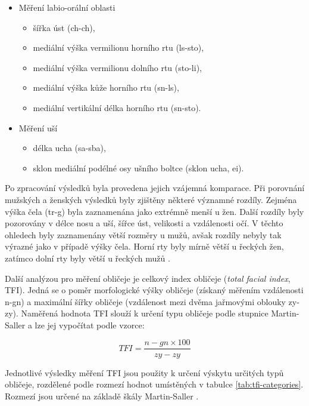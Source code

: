 \begin{itemize}
\begin{itemize}
    \end{itemize}
    \item Měření labio-orální oblasti
    \begin{itemize}
        \item šířka úst (ch-ch),
        \item mediální výška vermilionu horního rtu (ls-sto),
        \item mediální výška vermilionu dolního rtu (sto-li),
        \item mediální výška kůže horního rtu (sn-ls),
        \item mediální vertikální délka horního rtu (sn-sto).
    \end{itemize}
    \item Měření uší
    \begin{itemize}
        \item délka ucha (sa-sba),
        \item sklon mediální podélné osy ušního boltce (sklon ucha, ei).
    \end{itemize}
\end{itemize}

Po zpracování výsledků byla provedena jejich vzájemná komparace. Při porovnání mužských a ženských výsledků byly zjištěny některé významné rozdíly. Zejména výška čela (tr-g) byla zaznamenána jako extrémně menší u žen. Další rozdíly byly pozorovány v délce nosu a uší, šířce úst, velikosti a vzdálenosti očí. V těchto ohledech byly zaznamenány větší rozměry u mužů, avšak rozdíly nebyly tak výrazné jako v případě výšky čela. Horní rty byly mírně větší u řeckých žen, zatímco dolní rty byly větší u řeckých mužů \cite{Zacharopoulos2016}.

\bigskip

\noindent Další analýzou pro měření obličeje je celkový index obličeje \cite{Jeremic2013} (\textit{total facial index}, TFI). Jedná se o poměr morfologické výšky obličeje (získaný měřením vzdálenosti n-gn) a maximální šířky obličeje (vzdálenost mezi dvěma  jařmovými oblouky zy-zy). Naměřená hodnota TFI slouží k určení typu obličeje podle stupnice Martin-Saller a lze jej vypočítat podle vzorce:

\begin{equation}
    TFI = \frac{n-gn \times 100}{zy-zy}
    \label{eq:facial-index}
\end{equation}

\noindent Jednotlivé výsledky měření TFI jsou použity k určení výskytu určitých typů obličeje, rozdělené podle rozmezí hodnot umístěných v tabulce \ref{tab:tfi-categories}. Rozmezí jsou určené na základě škály Martin-Saller \cite{Jeremic2013}.

